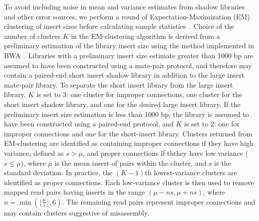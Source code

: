 \documentclass{bioinfo}
\begin{document}
To avoid including noise in mean and variance estimates from shadow libraries and other error sources, 
we perform a round of Expectation-Maximization (EM) clustering of insert sizes before calculating sample statistics~\citep{GuptaChen2010}. 
Choice of the number of clusters $K$ in
the EM-clustering algorithm is derived from a preliminary estimation of the library insert size using the method implemented in
BWA~\citep{bwa}. Libraries with a preliminary
insert size estimate greater than 1000 bp are assumed to have been constructed using a mate-pair protocol, and therefore
may contain a paired-end short insert shadow library in addition to the large insert mate-pair library. To separate the short insert library
from the large insert library, $K$ is set to 3: one cluster for improper connections, one cluster for the short insert
shadow library, and one for the desired large insert library. If the preliminary insert size estimation is less than 1000 bp, the library
is assumed to have been constructed using a paired-end protocol, and $K$ is set to 2: one for improper connections
and one for the short-insert library. Clusters returned from EM-clustering are identified as containing improper connections if 
they have high variance, defined as $s > \mu$, and proper connections if ththey have low variance ($s \le \mu$), where $\mu$ is the mean insert of pairs within
the cluster, and $s$ is the standard deviation. In practice, the $(K-1)$th lowest-variance clusters are identified as proper connections.
Each low-variance cluster is then used to remove mapped read pairs 
having inserts in the range $(\mu-ns,\mu+ns)$, where $n = \min(\lfloor\frac{\mu}{s}\rfloor, 6)$.  The remaining read
pairs represent improper connections and may contain clusters suggestive of misassembly.
\end{document}
